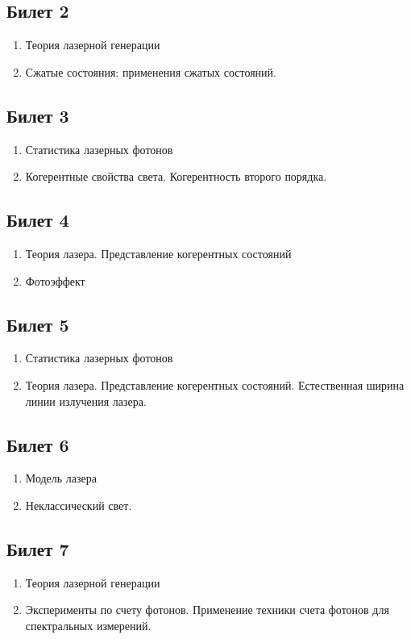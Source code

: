 \documentclass[12pt,a4paper]{article}
\begin{document}
\subsection*{Билет 2} 
\begin{enumerate}
\item Теория лазерной генерации
\item Сжатые состояния: применения сжатых состояний. 
\end{enumerate}

\subsection*{Билет 3} 
\begin{enumerate}
\item Статистика лазерных фотонов
\item Когерентные свойства света.
 Когерентность второго порядка.
\end{enumerate}

\subsection*{Билет 4} 
\begin{enumerate}
\item Теория лазера. Представление когерентных состояний
\item Фотоэффект
\end{enumerate}

\subsection*{Билет 5} 
\begin{enumerate}
\item Статистика лазерных фотонов
\item Теория лазера. Представление когерентных состояний. Естественная
  ширина линии излучения лазера.
\end{enumerate}

\subsection*{Билет 6} 
\begin{enumerate}
\item Модель лазера
\item Неклассический свет.
\end{enumerate}

\subsection*{Билет 7} 
\begin{enumerate}
\item Теория лазерной генерации
\item Эксперименты по счету фотонов. Применение техники счета
  фотонов для спектральных измерений.
\end{enumerate}
\end{document}

